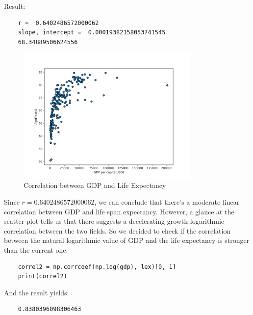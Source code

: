 Result:
\begin{verbatim}
    r =  0.6402486572000062
    slope, intercept =  0.00019382158053741545 
    68.34889506624556
\end{verbatim}
\newpage
\begin{figure}[t]
    \centering
    \includegraphics[width=0.8\textwidth]{figures/scatterplot.png}
    \caption{Correlation between GDP and Life Expectancy}
    \label{fig:gdp-lex-scatter}
\end{figure}
Since $r = 0.6402486572000062$, we can conclude that there's a moderate linear correlation between GDP and life span expectancy. However, a glance at the scatter plot tells us that there suggests a decelerating growth logarithmic correlation between the two fields. So we decided to check if the correlation between the natural logarithmic value of GDP and the life expectancy is stronger than the current one.

\begin{verbatim}
    correl2 = np.corrcoef(np.log(gdp), lex)[0, 1]
    print(correl2)
\end{verbatim}

And the result yields:
\begin{verbatim}
    0.8380396098306463
\end{verbatim}


